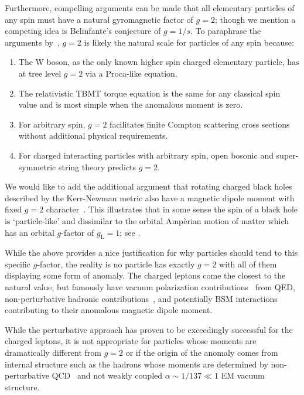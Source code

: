 Furthermore, compelling arguments can be made that all elementary particles of any spin must have a natural gyromagnetic factor of $g\!=\!2$; though we mention a competing idea is Belinfante's conjecture of $g\!=\!1/s$. To paraphrase the arguments by~\citet*{Ferrara:1992yc}, $g\!=\!2$ is likely the natural scale for particles of any spin because:
\begin{enumerate}[nosep]
	\item The W boson, as the only known higher spin charged elementary particle, has at tree level $g\!=\!2$ via a Proca-like equation.
	\item The relativistic TBMT torque equation is the same for any classical spin value and is most simple when the anomalous moment is zero.
	\item For arbitrary spin, $g\!=\!2$ facilitates finite Compton scattering cross sections without additional physical requirements.
	\item For charged interacting particles with arbitrary spin, open bosonic and super-symmetric string theory predicts $g\!=\!2$.
\end{enumerate}
We would like to add the additional argument that rotating charged black holes described by the Kerr-Newman metric also have a magnetic dipole moment with fixed $g\!=\!2$ character~\citep{Carter:1968rr}. This illustrates that in some sense the spin of a black hole is `particle-like' and dissimilar to the orbital Amp{\`e}rian motion of matter which has an orbital $g$-factor of $g_\mathrm{L}\!=\!1$; see .

While the above provides a nice justification for why particles should tend to this specific $g$-factor, the reality is no particle has exactly $g\!=\!2$ with all of them displaying some form of anomaly. The charged leptons come the closest to the natural value, but famously have vacuum polarization contributions~\citep{Schwinger:1951nm} from QED, non-perturbative hadronic contributions~\citep{Jegerlehner:2017gek}, and potentially BSM interactions~\citep{Knecht:2003kc} contributing to their anomalous magnetic dipole moment.

While the perturbative approach has proven to be exceedingly successful for the charged leptons, it is not appropriate for particles whose moments are dramatically different from $g\!=\!2$ or if the origin of the anomaly comes from internal structure such as the hadrons whose moments are determined by non-perturbative QCD~\citep{Pacetti:2014jai} and not weakly coupled $\alpha\sim1/137\ll1$ EM vacuum structure.

